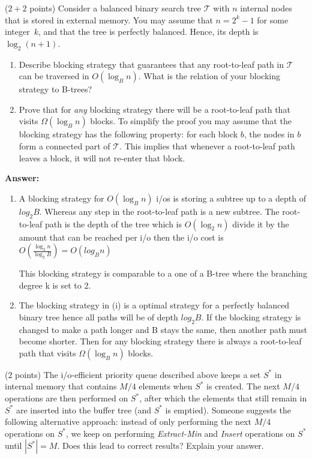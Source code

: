 \documentclass{article}
\newcommand{\tree}{\ensuremath{\mathcal{T}}}
\newcommand{\io}{{\sc i/o}\xspace}
\newcommand{\ios}{{\io}s\xspace}
\newcounter{rcounter}
\newenvironment{rlist}%
{\begin{list}{\setnr-\arabic{rcounter}}{\usecounter{rcounter}}}{\end{list}}
\begin{document}
\begin{rlist}

\item ($2 + 2$ points)
    Consider a balanced binary search tree $\tree$ with $n$ internal nodes that is stored in external memory. You may assume that $n=2^k-1$ for some integer~$k$, and that the tree is perfectly balanced.
    Hence, its depth is~$\log_2 (n+1)$.
    \begin{enumerate}
        \item[(i)]
            Describe blocking strategy that guarantees that any root-to-leaf path in $\tree$ can be traversed in $O(\log_B n)$. What is the relation of your blocking strategy to B-trees?
        \item[(ii)]
            Prove that for \emph{any} blocking strategy there will be a root-to-leaf path that visits $\Omega(\log_B n)$ blocks. To simplify the proof you may assume that the blocking strategy has the following property: for each block $b$, the nodes in $b$ form a connected part of $\tree$. This implies that whenever a root-to-leaf path leaves a block, it will not re-enter that block. 
    \end{enumerate}
    
    \textbf{Answer:}
    \begin{enumerate}
        \item[(i)]
    A blocking strategy for $O(\log_B n)$ \ios is storing a subtree up to a depth of $log_2 B$. Whereas any step in the root-to-leaf path is a new subtree. The root-to-leaf path is the depth of the tree which is $O(\log_2 n)$ divide it by the amount that can be reached per \io then the \io cost is $O(\frac{\log_2 n}{\log_2 B}) = O(log_B n)$
        
    
    This blocking strategy is comparable to a one of a B-tree where the branching degree k is set to 2.
    
    \item[(ii)]
    The blocking strategy in (i) is a optimal strategy for a perfectly balanced binary tree hence all paths will be of depth $log_2 B$. If the blocking strategy is changed to make a path longer and B stays the same, then another path must become shorter. Then for any blocking strategy there is always a root-to-leaf path that visits $\Omega(\log_B n)$ blocks.
    \end{enumerate} 
\item (2 points)
    The \io-efficient priority queue described above keeps a set $S^*$ in internal memory that contains $M/4$ elements when $S^*$ is created. The next $M/4$ operations are then performed on $S^*$, after which the elements that still remain in $S^*$ are inserted into the buffer tree (and $S^*$ is emptied). Someone suggests the following alternative approach: instead of only performing the next $M/4$ operations on $S^*$, we keep on performing \emph{Extract-Min} and \emph{Insert} operations on $S^*$ until $|S^*|=M$. Does this lead to correct results? Explain your answer.
    

\end{rlist}
\end{document}
